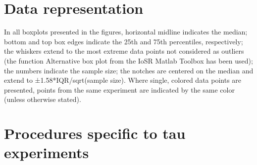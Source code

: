\section{Data representation}
In all boxplots presented in the figures, horizontal midline indicates the median; bottom and top box edges indicate the 25th and 75th percentiles, respectively; the whiskers extend to the most extreme data points not considered as outliers (the function Alternative box plot from the IoSR Matlab Toolbox has been used); the numbers indicate the sample size; the notches are centered on the median and extend to ±1.58*IQR/sqrt(sample size). Where single, colored data points are presented, points from the same experiment are indicated by the same color (unless otherwise stated). 

\section{Procedures specific to tau experiments}

